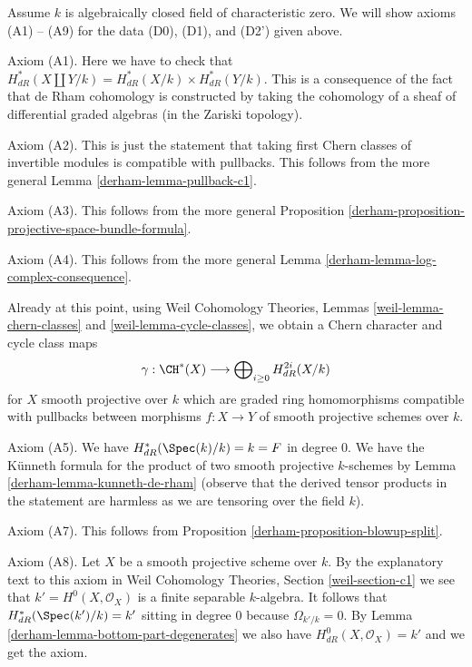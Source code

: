 \medskip\noindent
Assume $k$ is algebraically closed field of characteristic zero.
We will show axioms (A1) -- (A9) for the data (D0), (D1), and (D2')
given above.

\medskip\noindent
Axiom (A1). Here we have to check that
$H^*_{dR}(X \coprod Y/k) =  H^*_{dR}(X/k) \times H^*_{dR}(Y/k)$.
This is a consequence of the fact that de Rham cohomology
is constructed by taking the cohomology of a sheaf of differential
graded algebras (in the Zariski topology).

\medskip\noindent
Axiom (A2). This is just the statement that taking first Chern
classes of invertible modules is compatible with pullbacks.
This follows from the more general Lemma \ref{derham-lemma-pullback-c1}.

\medskip\noindent
Axiom (A3). This follows from the more general
Proposition \ref{derham-proposition-projective-space-bundle-formula}.

\medskip\noindent
Axiom (A4). This follows from the more general
Lemma \ref{derham-lemma-log-complex-consequence}.

\medskip\noindent
Already at this point, using
Weil Cohomology Theories, Lemmas \ref{weil-lemma-chern-classes} and
\ref{weil-lemma-cycle-classes}, we obtain a Chern character and
cycle class maps
$$
\gamma :
\CH^*(X)
\longrightarrow
\bigoplus\nolimits_{i \geq 0} H^{2i}_{dR}(X/k)
$$
for $X$ smooth projective over $k$ which are graded ring homomorphisms
compatible with pullbacks between morphisms $f : X \to Y$
of smooth projective schemes over $k$.

\medskip\noindent
Axiom (A5). We have $H_{dR}^*(\Spec(k)/k) = k = F$ in degree $0$.
We have the K\"unneth formula for the product of two smooth projective
$k$-schemes by Lemma \ref{derham-lemma-kunneth-de-rham} (observe that the
derived tensor products in the statement are harmless as we are
tensoring over the field $k$).

\medskip\noindent
Axiom (A7). This follows from Proposition \ref{derham-proposition-blowup-split}.

\medskip\noindent
Axiom (A8). Let $X$ be a smooth projective scheme over $k$.
By the explanatory text to this axiom in
Weil Cohomology Theories, Section \ref{weil-section-c1}
we see that $k' = H^0(X, \mathcal{O}_X)$ is a finite
separable $k$-algebra. It follows that $H_{dR}^*(\Spec(k')/k) = k'$
sitting in degree $0$ because $\Omega_{k'/k} = 0$. By
Lemma \ref{derham-lemma-bottom-part-degenerates}
we also have $H_{dR}^0(X, \mathcal{O}_X) = k'$ and we get
the axiom.

